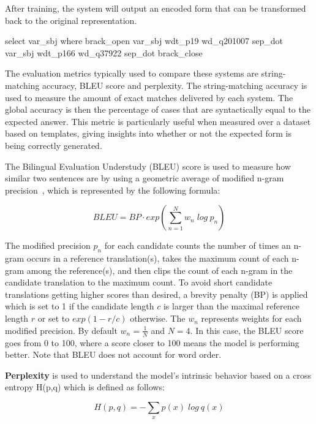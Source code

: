 After training, the system will output an encoded form that can be transformed back to the 
original \SPARQL{} representation. 

\begin{sparqlcode}[%
    caption={\SPARQL{} query after encoding (note it excludes the \texttt{PREFIX} clauses).}, 
    label={lst:encodedWikidataSparqlExample}]
select var_sbj where brack_open var_sbj wdt_p19 wd_q201007 sep_dot var_sbj wdt_p166 wd_q37922 sep_dot brack_close
\end{sparqlcode}

The evaluation metrics typically used to compare these systems are string-matching accuracy, 
BLEU score and perplexity. The string-matching accuracy is used to measure the amount of exact 
matches delivered by each system. The global accuracy is then the percentage of cases that are 
syntactically equal to the expected answer. This metric is particularly useful when measured 
over a dataset based on \SPARQL{} templates, giving insights into whether or not the expected 
\SPARQL{} form is being correctly generated.

The Bilingual Evaluation Understudy (BLEU) score is used to measure how similar two sentences 
are by using a geometric average of modified n-gram precision~\cite{nlToSparql:PapineniRWZ02}, 
which is represented by the following formula:

\[
    BLEU = BP \cdot exp(\sum_{n=1}^N w_n \; log \: p_n)    
\]

The modified precision $p_n$ for each candidate counts the number of times an n-gram occurs in a 
reference translation(s), takes the maximum count of each n-gram among the reference(s), and 
then clips the count of each n-gram in the candidate translation to the maximum count. To avoid 
short candidate translations getting higher scores than desired, a brevity penalty (BP) is 
applied which is set to 1 if the candidate length $c$ is larger than the maximal reference 
length $r$ or set to $exp(1-r/c)$ otherwise. The $w_n$ represents weights for each modified 
precision. By default $w_n=\frac{1}{N}$ and $N=4$. In this case, the BLEU score goes from 0 to 
100, where a score closer to 100 means the model is performing better. Note that BLEU does not 
account for word order. 

\textbf{Perplexity} is used to understand the model’s intrinsic behavior based on a cross 
entropy H(p,q) which is defined as follows:

\[
    H(p,q)= -\sum_x p(x) \; log \: q(x)
\]

